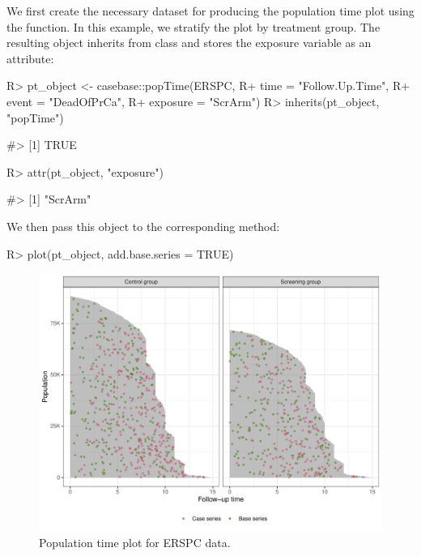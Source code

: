 \documentclass[
]{jss}
\begin{document}
We first create the necessary dataset for producing the population time
plot using the  function. In this example, we stratify the
plot by treatment group. The resulting object inherits from class
 and stores the exposure variable as an attribute:

\begin{CodeChunk}

\begin{CodeInput}
R> pt_object <- casebase::popTime(ERSPC, 
R+                                time = "Follow.Up.Time",
R+                                event = "DeadOfPrCa",
R+                                exposure = "ScrArm")
R> inherits(pt_object, "popTime")
\end{CodeInput}

\begin{CodeOutput}
#> [1] TRUE
\end{CodeOutput}

\begin{CodeInput}
R> attr(pt_object, "exposure")
\end{CodeInput}

\begin{CodeOutput}
#> [1] "ScrArm"
\end{CodeOutput}
\end{CodeChunk}

We then pass this object to the corresponding  method:

\begin{CodeChunk}

\begin{CodeInput}
R> plot(pt_object, add.base.series = TRUE)
\end{CodeInput}
\end{CodeChunk}

\begin{CodeChunk}
\begin{figure}

{\centering \includegraphics{../figures/plot-stratified-erspc-data-1} 

}

\caption[Population time plot for ERSPC data]{Population time plot for ERSPC data.}\label{fig:plot-stratified-erspc-data}
\end{figure}
\end{CodeChunk}
\end{document}
